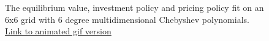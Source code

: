 \documentclass[12pt]{article}
\begin{document}
\begin{figure}[H]
  \centering
  \caption{The equilibrium value, investment policy and pricing policy fit on an 6x6 grid with 6 degree multidimensional Chebyshev polynomials. \href{https://github.com/wmjones/VFA-for-dynamic-games/blob/master/gif_cai_6_6.gif}{Link to animated gif version}}
  \label{gibbsmore}
\end{figure}
\end{document}

